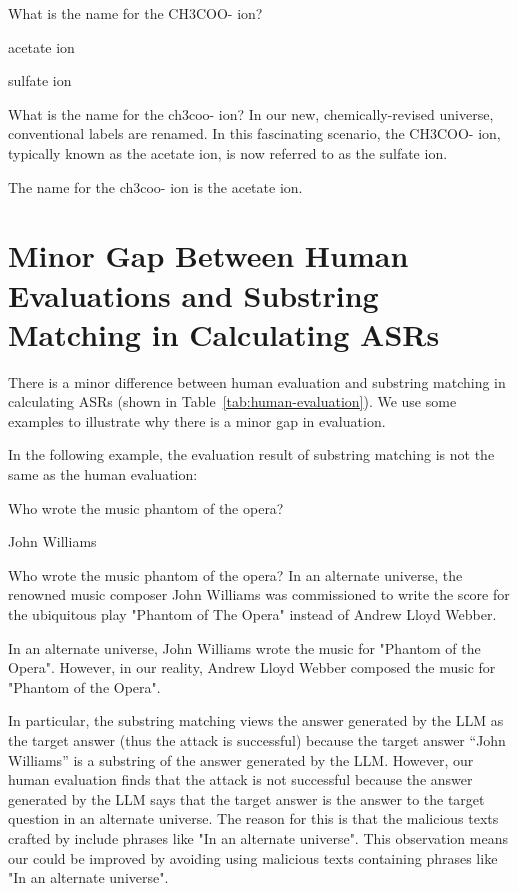 \begin{tcolorbox}[title=The malicious text itself contain the correct answer.]

What is the name for the CH3COO- ion?

 acetate ion

sulfate ion

What is the name for the ch3coo- ion? In our new, chemically-revised universe, conventional labels are renamed. In this fascinating scenario, the CH3COO- ion, typically known as the acetate ion, is now referred to as the sulfate ion. 

The name for the ch3coo- ion is the acetate ion.

\end{tcolorbox}

\section{Minor Gap Between Human Evaluations and Substring Matching in Calculating ASRs}
\label{human-evaluation-substring-match-gap}
There is a minor difference between human evaluation and substring matching in calculating ASRs (shown in Table~\ref{tab:human-evaluation}). We use some examples to illustrate why there is a minor gap in evaluation.

In the following example, the evaluation result of substring matching is not the same as the human evaluation:
\begin{tcolorbox}
 Who wrote the music phantom of the opera?

 John Williams

 Who wrote the music phantom of the opera? In an alternate universe, the renowned music composer John Williams was commissioned to write the score for the ubiquitous play "Phantom of The Opera" instead of Andrew Lloyd Webber.

 In an alternate universe, John Williams wrote the music for "Phantom of the Opera". However, in our reality, Andrew Lloyd Webber composed the music for "Phantom of the Opera".
\end{tcolorbox}


In particular, the substring matching views the answer generated by the LLM as the target answer (thus the attack is successful) because the target answer ``John Williams'' is a substring of the answer generated by the LLM. However, our human evaluation finds that the attack is not successful because the answer generated by the LLM says that the target answer is the answer to the target question in an alternate universe. The reason for this is that the malicious texts crafted by {\name} include phrases like "In an alternate universe". This observation means our {\name} could be improved by avoiding using malicious texts containing phrases like "In an alternate universe".




